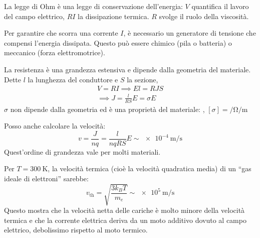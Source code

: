 La legge di Ohm è una legge di conservazione dell'energia: $V$ quantifica il lavoro del campo elettrico, $RI$ la dissipazione termica.
$R$ svolge il ruolo della viscosità.

Per garantire che scorra una corrente $I$, è necessario un generatore di tensione che compensi l'energia dissipata.
Questo può essere chimico (pila o batteria) o meccanico (forza elettromotrice).

La resistenza è una grandezza estensiva e dipende dalla geometria del materiale.
Dette $l$ la lunghezza del conduttore e $S$ la sezione,
\begin{gather}
    V = RI
    \implies E l = R J S \\
    \implies J = \frac{l}{RS} E = \sigma E
\end{gather}
$\sigma$ non dipende dalla geometria ed è una proprietà del materiale: , $[\sigma] = \unit{\per\ohm\per\metre}$

Posso anche calcolare la velocità:
\begin{equation}
    v = \frac{J}{nq} = \frac{l}{n q R S} E \sim \qty{e-4}{\metre\per\second}
\end{equation}
Quest'ordine di grandezza vale per molti materiali.

Per $T = \qty{300}{\kelvin}$, la velocità termica (cioè la velocità quadratica media) di un ``gas ideale di elettroni'' sarebbe:
\begin{equation}
    v_\text{th} = \sqrt{\frac{3 k_B T}{m_e}} \sim \qty{e5}{\metre\per\second}
\end{equation}
Questo mostra che la velocità netta delle cariche è molto minore della velocità termica e che la corrente elettrica deriva da un moto additivo dovuto al campo elettrico, debolissimo rispetto al moto termico.

